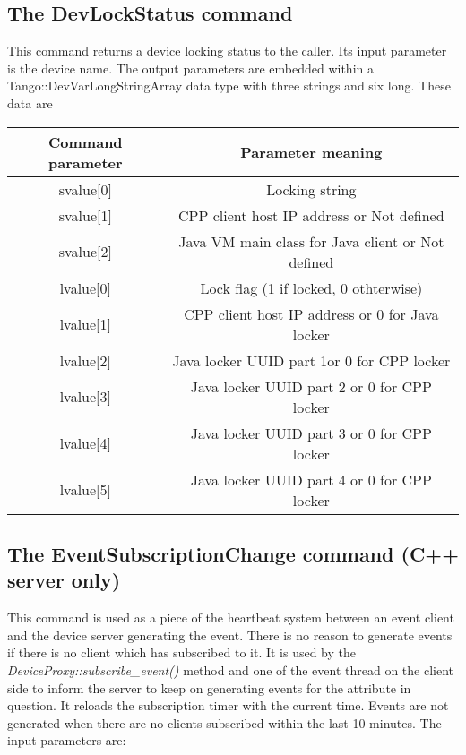\subsection{The DevLockStatus command}

This command returns a device locking status to the caller. Its input
parameter is the device name. The output parameters are embedded within
a Tango::DevVarLongStringArray data type with three strings and six
long. These data are\vspace{0.3cm}

\begin{center}
\begin{longtable}{|c|c|}
\hline 
Command parameter & Parameter meaning\tabularnewline
\hline 
\hline 
svalue{[}0{]} & Locking string\tabularnewline
\hline 
svalue{[}1{]} & CPP client host IP address or \textquotedbl{}Not defined\textquotedbl{}\tabularnewline
\hline 
svalue{[}2{]} & Java VM main class for Java client or \textquotedbl{}Not defined\textquotedbl{}\tabularnewline
\hline 
lvalue{[}0{]} & Lock flag (1 if locked, 0 othterwise)\tabularnewline
\hline 
lvalue{[}1{]} & CPP client host IP address or 0 for Java locker\tabularnewline
\hline 
lvalue{[}2{]} & Java locker UUID part 1or 0 for CPP locker\tabularnewline
\hline 
lvalue{[}3{]} & Java locker UUID part 2 or 0 for CPP locker\tabularnewline
\hline 
lvalue{[}4{]} & Java locker UUID part 3 or 0 for CPP locker\tabularnewline
\hline 
lvalue{[}5{]} & Java locker UUID part 4 or 0 for CPP locker\tabularnewline
\hline 
\end{longtable}
\par\end{center}

\vspace{0.3cm}


\subsection{The EventSubscriptionChange command
(C++ server only)}

This command is used as a piece of the \textquotedbl{}heartbeat\textquotedbl{}
system between an event client and the device server generating the
event. There is no reason to generate events if there is no client
which has subscribed to it. It is used by the \emph{DeviceProxy::subscribe\_event()}
method and one of the event thread on the client side to inform the
server to keep on generating events for the attribute in question.
It reloads the subscription timer with the current time. Events are
not generated when there are no clients subscribed within the last
10 minutes. The input parameters are:

